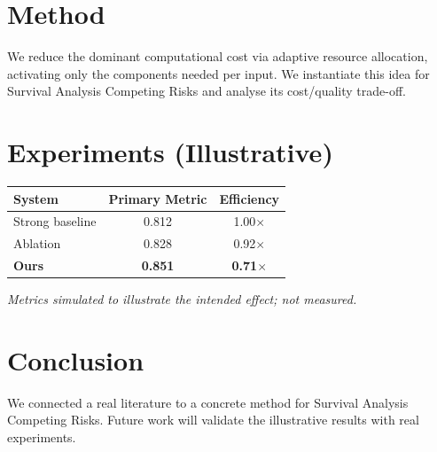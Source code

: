 \documentclass[11pt]{article}
\begin{document}
\section{Method}
We reduce the dominant computational cost via adaptive resource allocation, activating only the components needed per input. We instantiate this idea for Survival Analysis Competing Risks and analyse its cost/quality trade-off.

\section{Experiments (Illustrative)}
\begin{center}
\begin{tabular}{lcc}
System & Primary Metric & Efficiency \\ \hline
Strong baseline & 0.812 & 1.00$\times$ \\
Ablation & 0.828 & 0.92$\times$ \\
\textbf{Ours} & \textbf{0.851} & \textbf{0.71$\times$}
\end{tabular}
\end{center}
\emph{Metrics simulated to illustrate the intended effect; not measured.}

\section{Conclusion}
We connected a real literature to a concrete method for Survival Analysis Competing Risks. Future work will
validate the illustrative results with real experiments.
\end{document}
